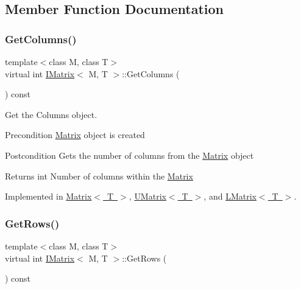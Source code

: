 \subsection{Member Function Documentation}
\mbox{\label{class_i_matrix_a3b84da3898ef38bdf281c13f218fc278}} 
\subsubsection{\texorpdfstring{GetColumns()}{GetColumns()}}
{\footnotesize\ttfamily template$<$class M, class T$>$ \\
virtual int \mbox{\hyperlink{class_i_matrix}{I\+Matrix}}$<$ M, T $>$\+::Get\+Columns (\begin{DoxyParamCaption}{ }\end{DoxyParamCaption}) const\hspace{0.3cm}{\ttfamily [pure virtual]}}



Get the Columns object. 

\begin{DoxyPrecond}{Precondition}
\mbox{\hyperlink{class_matrix}{Matrix}} object is created 
\end{DoxyPrecond}
\begin{DoxyPostcond}{Postcondition}
Gets the number of columns from the \mbox{\hyperlink{class_matrix}{Matrix}} object 
\end{DoxyPostcond}
\begin{DoxyReturn}{Returns}
int Number of columns within the \mbox{\hyperlink{class_matrix}{Matrix}} 
\end{DoxyReturn}


Implemented in \mbox{\hyperlink{class_matrix_ada60917bb197292e0645992e108c2c2f}{Matrix$<$ T $>$}}, \mbox{\hyperlink{class_u_matrix_a4065961abb79fd43d7abaf10c47e73d8}{U\+Matrix$<$ T $>$}}, and \mbox{\hyperlink{class_l_matrix_ae7adc0f92e3648751fe49852ad158ea2}{L\+Matrix$<$ T $>$}}.

\mbox{\label{class_i_matrix_a58632b018f4023768db7963e22f468da}} 
\subsubsection{\texorpdfstring{GetRows()}{GetRows()}}
{\footnotesize\ttfamily template$<$class M, class T$>$ \\
virtual int \mbox{\hyperlink{class_i_matrix}{I\+Matrix}}$<$ M, T $>$\+::Get\+Rows (\begin{DoxyParamCaption}{ }\end{DoxyParamCaption}) const\hspace{0.3cm}{\ttfamily [pure virtual]}}



